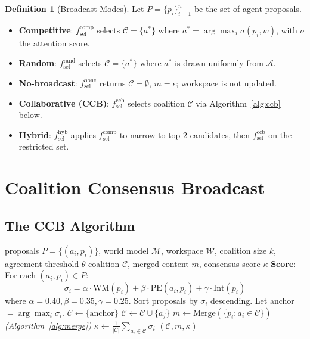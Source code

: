 \documentclass[11pt]{article}
\theoremstyle{definition}
\newtheorem{definition}{Definition}
\begin{document}
\begin{definition}[Broadcast Modes]
\label{def:modes}
Let $P = \{p_i\}_{i=1}^n$ be the set of agent proposals.
\begin{itemize}[noitemsep]
\item \textbf{Competitive}: $f_{\text{sel}}^{\text{comp}}$ selects $\mathcal{C} = \{a^*\}$
  where $a^* = \arg\max_i \sigma(p_i, w)$, with $\sigma$ the attention score.
\item \textbf{Random}: $f_{\text{sel}}^{\text{rand}}$ selects $\mathcal{C} = \{a^*\}$
  where $a^*$ is drawn uniformly from $\mathcal{A}$.
\item \textbf{No-broadcast}: $f_{\text{sel}}^{\text{none}}$ returns $\mathcal{C} = \emptyset$,
  $m = \epsilon$; workspace is not updated.
\item \textbf{Collaborative (CCB)}: $f_{\text{sel}}^{\text{ccb}}$ selects coalition $\mathcal{C}$
  via Algorithm~\ref{alg:ccb} below.
\item \textbf{Hybrid}: $f_{\text{sel}}^{\text{hyb}}$ applies $f_{\text{sel}}^{\text{comp}}$
  to narrow to top-2 candidates, then $f_{\text{sel}}^{\text{ccb}}$ on the restricted set.
\end{itemize}
\end{definition}


\section{Coalition Consensus Broadcast}
\label{sec:ccb}

\subsection{The CCB Algorithm}

\begin{algorithm}[h]
\caption{Coalition Consensus Broadcast (CCB)}
\label{alg:ccb}
\begin{algorithmic}[1]
\Require proposals $P = \{(a_i, p_i)\}$, world model $\mathcal{M}$, workspace $\mathcal{W}$,
  coalition size $k$, agreement threshold $\theta$
\Ensure coalition $\mathcal{C}$, merged content $m$, consensus score $\kappa$
\State \textbf{Score}: For each $(a_i, p_i) \in P$:
  \[\sigma_i = \alpha \cdot \text{WM}(p_i) + \beta \cdot \text{PE}(a_i, p_i) + \gamma \cdot \text{Int}(p_i)\]
  where $\alpha = 0.40, \beta = 0.35, \gamma = 0.25$.
\State Sort proposals by $\sigma_i$ descending. Let anchor $= \arg\max_i \sigma_i$.
\State $\mathcal{C} \gets \{\text{anchor}\}$
    \State $\mathcal{C} \gets \mathcal{C} \cup \{a_j\}$
  \EndIf
\EndFor
\State $m \gets \text{Merge}(\{p_i : a_i \in \mathcal{C}\})$ \quad \textit{(Algorithm~\ref{alg:merge})}
\State $\kappa \gets \frac{1}{|\mathcal{C}|}\sum_{a_i \in \mathcal{C}} \sigma_i$
\State \Return $(\mathcal{C}, m, \kappa)$
\end{algorithmic}
\end{algorithm}
\end{document}
